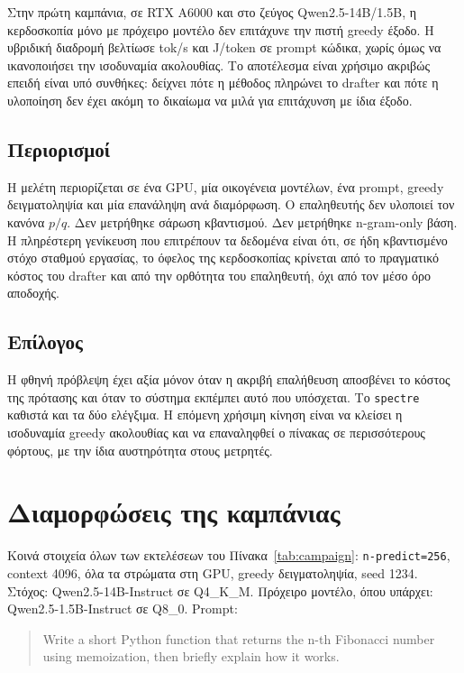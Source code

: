 \documentclass[a4paper,12pt]{report}
\theoremstyle{plain}
\theoremstyle{definition}
\theoremstyle{remark}
\begin{document}
Στην πρώτη καμπάνια, σε RTX A6000 και στο ζεύγος Qwen2.5-14B/1.5B, η
κερδοσκοπία μόνο με πρόχειρο μοντέλο δεν επιτάχυνε την πιστή greedy έξοδο. Η
υβριδική διαδρομή βελτίωσε tok/s και J/token σε prompt κώδικα, χωρίς όμως να
ικανοποιήσει την ισοδυναμία ακολουθίας. Το αποτέλεσμα είναι χρήσιμο ακριβώς
επειδή είναι υπό συνθήκες: δείχνει πότε η μέθοδος πληρώνει το drafter και
πότε η υλοποίηση δεν έχει ακόμη το δικαίωμα να μιλά για επιτάχυνση με ίδια
έξοδο.

\section{Περιορισμοί}

Η μελέτη περιορίζεται σε ένα GPU, μία οικογένεια μοντέλων, ένα prompt, greedy
δειγματοληψία και μία επανάληψη ανά διαμόρφωση. Ο επαληθευτής δεν υλοποιεί τον
κανόνα \(p/q\). Δεν μετρήθηκε σάρωση κβαντισμού. Δεν μετρήθηκε n-gram-only
βάση. Η πληρέστερη γενίκευση που επιτρέπουν τα δεδομένα είναι ότι, σε ήδη
κβαντισμένο στόχο σταθμού εργασίας, το όφελος της κερδοσκοπίας κρίνεται από
το πραγματικό κόστος του drafter και από την ορθότητα του επαληθευτή, όχι από
τον μέσο όρο αποδοχής.

\section{Επίλογος}

Η φθηνή πρόβλεψη έχει αξία μόνον όταν η ακριβή επαλήθευση αποσβένει το κόστος
της πρότασης και όταν το σύστημα εκπέμπει αυτό που υπόσχεται. Το
\texttt{spectre} καθιστά και τα δύο ελέγξιμα. Η επόμενη χρήσιμη κίνηση είναι
να κλείσει η ισοδυναμία greedy ακολουθίας και να επαναληφθεί ο πίνακας σε
περισσότερους φόρτους, με την ίδια αυστηρότητα στους μετρητές.

\appendix

\chapter{Διαμορφώσεις της καμπάνιας}
\label{app:configs}

Κοινά στοιχεία όλων των εκτελέσεων του Πίνακα~\ref{tab:campaign}:
\texttt{n-predict=256}, context 4096, όλα τα στρώματα στη GPU, greedy
δειγματοληψία, seed 1234. Στόχος: Qwen2.5-14B-Instruct σε Q4\_K\_M. Πρόχειρο
μοντέλο, όπου υπάρχει: Qwen2.5-1.5B-Instruct σε Q8\_0. Prompt:

\begin{quote}
  \small
  Write a short Python function that returns the n-th Fibonacci number using
  memoization, then briefly explain how it works.
\end{quote}
\end{document}
